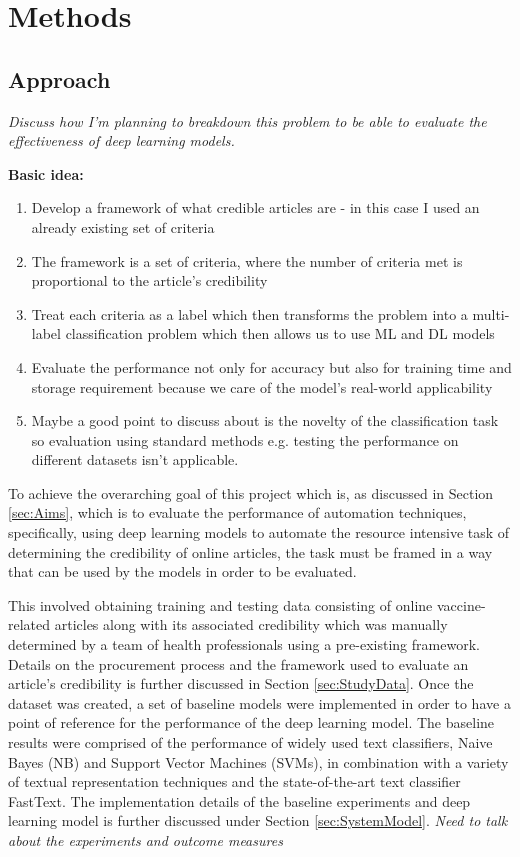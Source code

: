 \documentclass[a4paper,twoside,phd]{BYUPhys}
\begin{document}
\chapter{Methods}
\label{chap:Methods}

\section{Approach}
\label{sec:Approach}
\textit{Discuss how I'm planning to breakdown this problem to be able to evaluate the effectiveness of deep learning models.}

\textbf{Basic idea:}
\begin{enumerate}[-]
	\item Develop a framework of what credible articles are - in this case I used an already existing set of criteria
	\item The framework is a set of criteria, where the number of criteria met is proportional to the article's credibility
	\item Treat each criteria as a label which then transforms the problem into a multi-label classification problem which then allows us to use ML and DL models
	\item Evaluate the performance not only for accuracy but also for training time and storage requirement because we care of the model's real-world applicability
	\item Maybe a good point to discuss about is the novelty of the classification task so evaluation using standard methods e.g. testing the performance on different datasets isn't applicable.
\end{enumerate}

To achieve the overarching goal of this project which is, as discussed in Section \ref{sec:Aims}, which is to evaluate the performance of automation techniques, specifically, using deep learning models to automate the resource intensive task of determining the credibility of online articles, the task must be framed in a way that can be used by the models in order to be evaluated. \newline

This involved obtaining training and testing data consisting of online vaccine-related articles along with its associated credibility which was manually determined by a team of health professionals using a pre-existing framework. Details on the procurement process and the framework used to evaluate an article's credibility is further discussed in Section \ref{sec:StudyData}. 
Once the dataset was created, a set of baseline models were implemented in order to have a point of reference for the performance of the deep learning model. The baseline results were comprised of the performance of widely used text classifiers, Naive Bayes (NB) and Support Vector Machines (SVMs), in combination with a variety of textual representation techniques and the state-of-the-art text classifier FastText. The implementation details of the baseline experiments and deep learning model is further discussed under Section \ref{sec:SystemModel}. 
\textit{Need to talk about the experiments and outcome measures}
\end{document}
